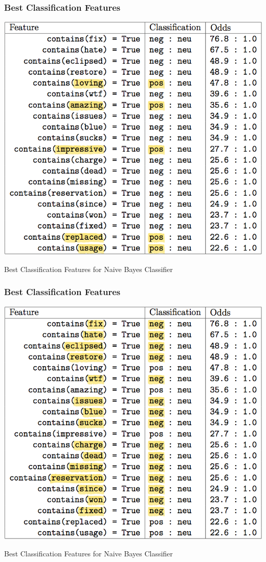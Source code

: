 \documentclass{beamer}
\begin{document}
\begin{frame}
\frametitle{Best Classification Features}
\begin{table}[h]
\centering
\includegraphics[scale=0.25]{img/table_bestfeatures_pos.png}
\caption{Best Classification Features for Naive Bayes Classifier}
\label{table:naive_features}
\end{table}
\end{frame}

\begin{frame}
\frametitle{Best Classification Features}
\begin{table}[h]
\centering
\includegraphics[scale=0.25]{img/table_bestfeatures_neg.png}
\caption{Best Classification Features for Naive Bayes Classifier}
\label{table:naive_features}
\end{table}
\end{frame}
\end{document}
